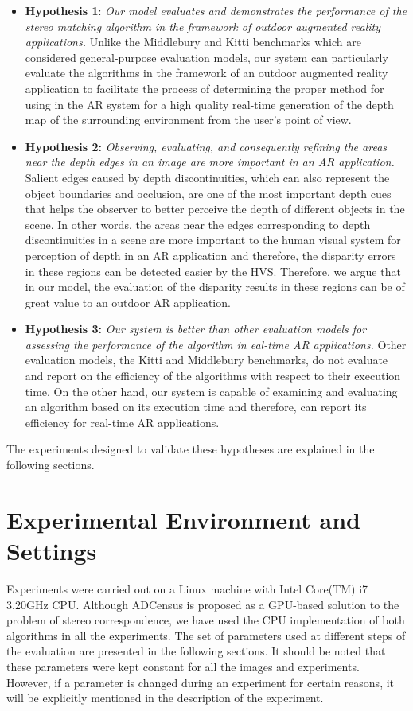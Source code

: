 \begin{itemize}
\item \textbf{Hypothesis 1}: \emph{Our model evaluates and demonstrates 
the performance of the stereo matching algorithm in the framework of 
outdoor augmented reality applications.} 
Unlike the Middlebury and Kitti benchmarks which are considered general-purpose evaluation models, 
our system can particularly evaluate the algorithms in the framework of an 
outdoor augmented reality application to facilitate the process of determining
the proper method for using in the AR system for a high quality real-time generation of the depth map of the surrounding environment from 
the user's point of view.

\item \textbf{Hypothesis 2:} \emph{Observing, evaluating, and consequently 
refining the areas near the depth edges in an image are more important in an AR application.}
Salient edges caused by depth discontinuities, 
which can also represent the object boundaries and occlusion, are one of the 
most important depth cues that helps the observer to better perceive the depth of different objects in the scene. In other words, the areas near the edges corresponding to depth discontinuities
in a scene are more important to the human visual system for perception of depth in an AR application and therefore, the disparity 
errors in these regions can be detected easier by the HVS. Therefore, we argue that in our model, the evaluation of the disparity results in these regions can be of great value 
to an outdoor AR application.

\item \textbf{Hypothesis 3:} \emph{Our system is better than other evaluation models for assessing the performance of the algorithm in
eal-time AR applications.}
Other evaluation models, the Kitti and Middlebury benchmarks, do not evaluate and report on the efficiency of the algorithms
with respect to their execution time. On the other hand, our system is capable of examining and evaluating an algorithm 
based on its execution time and therefore, can report its efficiency for real-time AR applications.

\end{itemize}

The experiments designed to validate these hypotheses are explained in the following sections.

\section{Experimental Environment and Settings}
Experiments were carried out on a Linux machine with Intel Core(TM) i7 3.20GHz CPU. 
Although ADCensus is proposed as a GPU-based solution to the problem of stereo correspondence, 
we have used the CPU implementation of both algorithms in all the experiments.
The set of parameters used at different steps of the evaluation are presented in the following sections.
It should be noted that these parameters were kept constant for all the images and experiments. However, if a parameter is changed during an experiment for certain
reasons, it will be explicitly mentioned in the description of the experiment.

